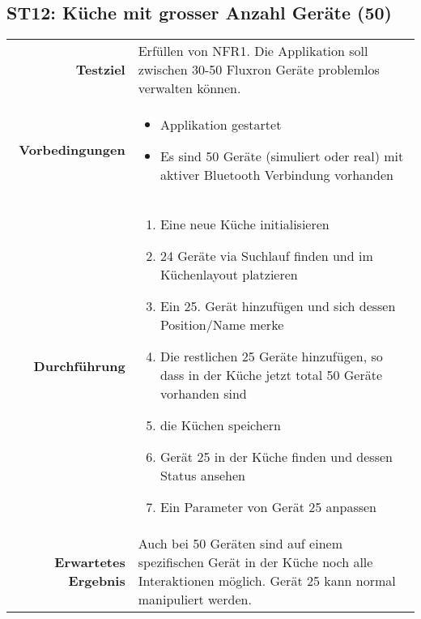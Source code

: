 \subsection{ST12: Küche mit grosser Anzahl Geräte (50)}
\begin{table}[H]
\begin{tabularx}{\textwidth}{r X }
\textbf{Testziel} & Erfüllen von \ac{NFR}1. Die Applikation soll zwischen 30-50 Fluxron Geräte problemlos verwalten können. \\
\textbf{Vorbedingungen} & \begin{itemize}
\item Applikation gestartet
\item Es sind 50 Geräte (simuliert oder real) mit aktiver Bluetooth Verbindung vorhanden
\end{itemize} \\
\textbf{Durchführung} & \begin{enumerate}
\item Eine neue Küche initialisieren
\item 24 Geräte via Suchlauf finden und im Küchenlayout platzieren
\item Ein 25. Gerät hinzufügen und sich dessen Position/Name merke
\item Die restlichen 25 Geräte hinzufügen, so dass in der Küche jetzt total 50 Geräte vorhanden sind
\item die Küchen speichern
\item Gerät 25 in der Küche finden und dessen Status ansehen
\item Ein Parameter von Gerät 25 anpassen
\end{enumerate} \\
\textbf{Erwartetes Ergebnis} & Auch bei 50 Geräten sind auf einem spezifischen Gerät in der Küche noch alle Interaktionen möglich. Gerät 25 kann normal manipuliert werden.\\
\end{tabularx}
\end{table}

